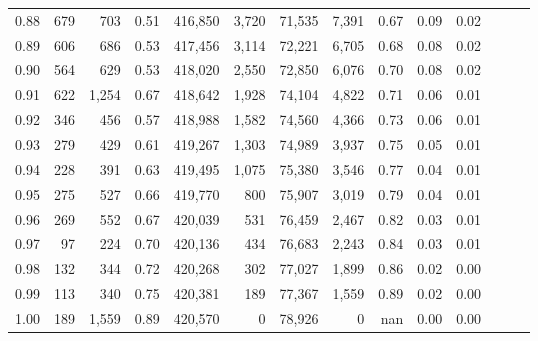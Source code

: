 \begin{tabular}{rrrrrrrrrrrrrr}
0.88 &     679 &    703 &  0.51 &  416,850 &    3,720 &  71,535 &   7,391 &  0.67 &  0.09 &      0.02 \\
0.89 &     606 &    686 &  0.53 &  417,456 &    3,114 &  72,221 &   6,705 &  0.68 &  0.08 &      0.02 \\
0.90 &     564 &    629 &  0.53 &  418,020 &    2,550 &  72,850 &   6,076 &  0.70 &  0.08 &      0.02 \\
0.91 &     622 &  1,254 &  0.67 &  418,642 &    1,928 &  74,104 &   4,822 &  0.71 &  0.06 &      0.01 \\
0.92 &     346 &    456 &  0.57 &  418,988 &    1,582 &  74,560 &   4,366 &  0.73 &  0.06 &      0.01 \\
0.93 &     279 &    429 &  0.61 &  419,267 &    1,303 &  74,989 &   3,937 &  0.75 &  0.05 &      0.01 \\
0.94 &     228 &    391 &  0.63 &  419,495 &    1,075 &  75,380 &   3,546 &  0.77 &  0.04 &      0.01 \\
0.95 &     275 &    527 &  0.66 &  419,770 &      800 &  75,907 &   3,019 &  0.79 &  0.04 &      0.01 \\
0.96 &     269 &    552 &  0.67 &  420,039 &      531 &  76,459 &   2,467 &  0.82 &  0.03 &      0.01 \\
0.97 &      97 &    224 &  0.70 &  420,136 &      434 &  76,683 &   2,243 &  0.84 &  0.03 &      0.01 \\
0.98 &     132 &    344 &  0.72 &  420,268 &      302 &  77,027 &   1,899 &  0.86 &  0.02 &      0.00 \\
0.99 &     113 &    340 &  0.75 &  420,381 &      189 &  77,367 &   1,559 &  0.89 &  0.02 &      0.00 \\
1.00 &     189 &  1,559 &  0.89 &  420,570 &        0 &  78,926 &       0 &   nan &  0.00 &      0.00 \\
\bottomrule
\end{tabular}
